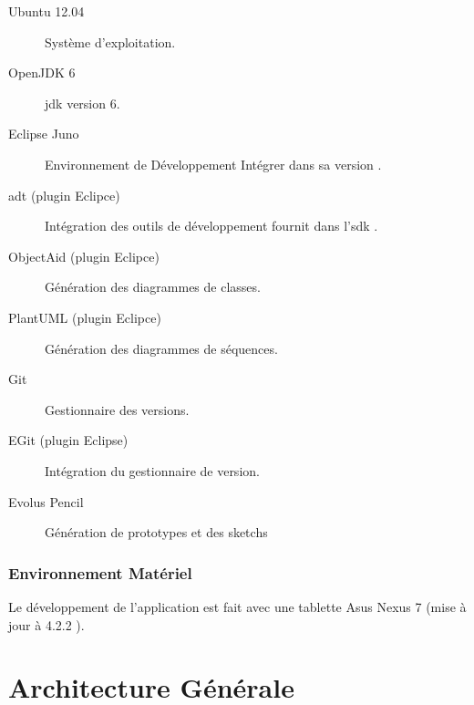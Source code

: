 \begin{description}

\item [Ubuntu 12.04] Système d'exploitation.\footnotemark[1]

\item [OpenJDK 6] \gls{jdk} version 6.\footnotemark[2]

\item [Eclipse Juno] Environnement de Développement Intégrer dans sa version .\footnotemark[3]

\item [\gls{adt} (plugin Eclipce)] Intégration des outils de développement fournit dans l'\gls{sdk} \android{}.\footnotemark[4]

\item [ObjectAid (plugin Eclipce)] Génération des diagrammes de classes.\footnotemark[5]

\item [PlantUML (plugin Eclipce)] Génération des diagrammes de séquences.\footnotemark[6]

\item [Git] Gestionnaire des versions\footnotemark[7].

\item [EGit (plugin Eclipse)] Intégration du gestionnaire de version.\footnotemark[8]

\item [Evolus Pencil] Génération de prototypes et des sketchs\footnotemark[9]
\end{description}


\subsubsection{Environnement Matériel}
Le développement de l'application est fait avec une tablette Asus Nexus 7 (mise à jour à \android{} 4.2.2 ).

\section{Architecture Générale}

